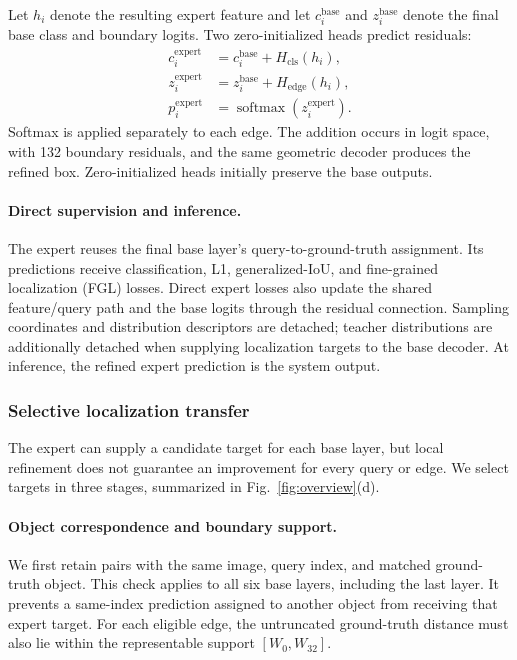 Let $h_i$ denote the resulting expert feature and let $c_i^{\mathrm{base}}$ and $z_i^{\mathrm{base}}$ denote the final base class and boundary logits. Two zero-initialized heads predict residuals:
\begin{equation}
\begin{aligned}
c_i^{\mathrm{expert}}&=c_i^{\mathrm{base}}+H_{\mathrm{cls}}(h_i),\\
z_i^{\mathrm{expert}}&=z_i^{\mathrm{base}}+H_{\mathrm{edge}}(h_i),\\
p_i^{\mathrm{expert}}&=\operatorname{softmax}(z_i^{\mathrm{expert}}).
\end{aligned}
\label{eq:residual}
\end{equation}
Softmax is applied separately to each edge. The addition occurs in logit space, with 132 boundary residuals, and the same geometric decoder produces the refined box. Zero-initialized heads initially preserve the base outputs.

\paragraph{Direct supervision and inference.}
The expert reuses the final base layer's query-to-ground-truth assignment. Its predictions receive classification, L1, generalized-IoU, and fine-grained localization (FGL) losses. Direct expert losses also update the shared feature/query path and the base logits through the residual connection. Sampling coordinates and distribution descriptors are detached; teacher distributions are additionally detached when supplying localization targets to the base decoder. At inference, the refined expert prediction is the system output.

\subsubsection{Selective localization transfer}
The expert can supply a candidate target for each base layer, but local refinement does not guarantee an improvement for every query or edge. We select targets in three stages, summarized in Fig.~\ref{fig:overview}(d).



\paragraph{Object correspondence and boundary support.}
We first retain pairs with the same image, query index, and matched ground-truth object. This check applies to all six base layers, including the last layer. It prevents a same-index prediction assigned to another object from receiving that expert target. For each eligible edge, the untruncated ground-truth distance must also lie within the representable support $[W_0,W_{32}]$.


